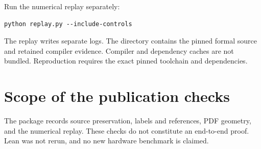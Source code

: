 Run the numerical replay separately:
\begin{lstlisting}
python replay.py --include-controls
\end{lstlisting}
The replay writes separate logs. The  directory contains the pinned formal source and retained compiler evidence. Compiler and dependency caches are not bundled. Reproduction requires the exact pinned toolchain and dependencies.

\section{Scope of the publication checks}
The package records source preservation, labels and references, PDF geometry, and the numerical replay. These checks do not constitute an end-to-end proof. Lean was not rerun, and no new hardware benchmark is claimed.
